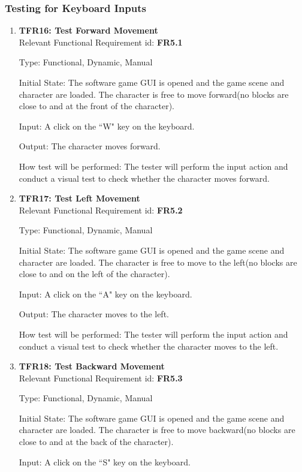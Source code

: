 \documentclass[12pt, titlepage]{article}
\begin{document}
\subsubsection{Testing for Keyboard Inputs}
\begin{enumerate}
\item{\textbf{TFR16: Test Forward Movement}\\}
\label{move}
Relevant Functional Requirement id: \textbf{FR5.1}

Type: Functional, Dynamic, Manual

Initial State: The software game GUI is opened and the game scene and character are loaded. The character is free to move forward(no blocks are close to and at the front of the character).

Input: A click on the ``W" key on the keyboard.

Output: The character moves forward.

How test will be performed: The tester will perform the input action and conduct a visual test to check whether the character moves forward.



\item{\textbf{TFR17: Test Left Movement}\\}
Relevant Functional Requirement id: \textbf{FR5.2}

Type: Functional, Dynamic, Manual

Initial State: The software game GUI is opened and the game scene and character are loaded. The character is free to move to the left(no blocks are close to and on the left of the character).

Input: A click on the ``A" key on the keyboard.

Output: The character moves to the left.

How test will be performed: The tester will perform the input action and conduct a visual test to check whether the character moves to the left.

\item{\textbf{TFR18: Test Backward Movement}\\}
Relevant Functional Requirement id: \textbf{FR5.3}

Type: Functional, Dynamic, Manual

Initial State: The software game GUI is opened and the game scene and character are loaded. The character is free to move backward(no blocks are close to and at the back of the character).

Input: A click on the ``S" key on the keyboard.


\end{enumerate}
\end{document}

